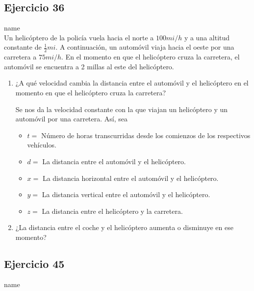\documentclass[12pt]{article}
\begin{document}
\subsection{Ejercicio 36} name \\

Un helicóptero de la policía vuela hacia el norte a $100 mi/h$ y a una altitud constante de $\frac{1}{2} mi$. A continuación, un automóvil viaja hacia el oeste por una carretera a $75 mi/h$. En el momento en que el helicóptero cruza la carretera, el automóvil se encuentra a 2 millas al este del helicóptero.
\begin{enumerate}
\item ¿A qué velocidad cambia la distancia entre el automóvil y el helicóptero en el momento en que el helicóptero cruza la carretera?

Se nos da la velocidad constante con la que viajan un helicóptero y un automóvil por una carretera. Así, sea
\begin{itemize}
\item $t=$ Número de horas transcurridas desde los comienzos de los respectivos vehículos.
\item $d=$ La distancia entre el automóvil y el helicóptero.
\item $x=$ La distancia horizontal entre el automóvil y el helicóptero.
\item $y=$ La distancia vertical entre el automóvil y el helicóptero.
\item $z=$ La distancia entre el helicóptero y la carretera.
\end{itemize}

\item ¿La distancia entre el coche y el helicóptero aumenta o disminuye en ese momento?
\end{enumerate}

\subsection{Ejercicio 45} name \\
\end{document}
